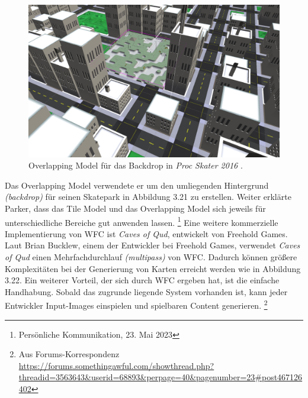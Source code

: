 \documentclass[12pt, a4paper,twoside,openany]{report} %
\begin{document}
\begin{figure}
    \includegraphics[width=1\linewidth]{images/proc-skate-backdrop.png}%
    \caption{Overlapping Model für das Backdrop in \textit{Proc Skater 2016} \cite{procskater2016}.}%
\end{figure}

Das Overlapping Model verwendete er um den umliegenden Hintergrund \textit{(backdrop)} für seinen Skatepark in Abbildung 3.21 zu erstellen.
Weiter erklärte Parker, dass das Tile Model und das Overlapping Model sich jeweils für unterschiedliche Bereiche gut anwenden lassen.
\footnote[5]{Persönliche Kommunikation, 23. Mai 2023}
\newline
Eine weitere kommerzielle Implementierung von WFC ist \textit{Caves of Qud}, entwickelt von Freehold Games.
Laut Brian Bucklew, einem der Entwickler bei Freehold Games, verwendet \textit{Caves of Qud} einen Mehrfachdurchlauf \textit{(multipass)} von WFC.
Dadurch können größere Komplexitäten bei der Generierung von Karten erreicht werden wie in Abbildung 3.22.
Ein weiterer Vorteil, der sich durch WFC ergeben hat, ist die einfache Handhabung.
Sobald das zugrunde liegende System vorhanden ist, kann jeder Entwickler Input-Images einspielen und spielbaren Content generieren.
\footnote[6]{Aus Forums-Korrespondenz \url{https://forums.somethingawful.com/showthread.php?threadid=3563643&userid=68893&perpage=40&pagenumber=23\#post467126402}} \cite{Karth2017WaveFunctionCollapseIC}
\end{document}
